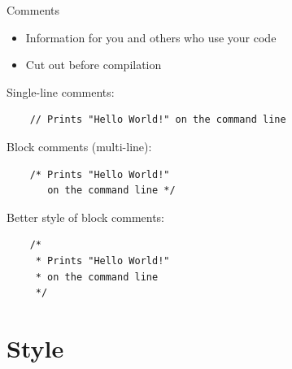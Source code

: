 \begin{frame}[fragile]{Comments}
	\begin{itemize}
		\item Information for you and others who use your code
		\item Cut out before compilation
	\end{itemize}
	Single-line comments:
	\begin{lstlisting}
	// Prints "Hello World!" on the command line
\end{lstlisting}
	Block comments (multi-line):
	\begin{lstlisting}
	/* Prints "Hello World!"
	   on the command line */
\end{lstlisting}
	Better style of block comments:
	\begin{lstlisting}
	/*
	 * Prints "Hello World!"
	 * on the command line
	 */
\end{lstlisting}
\end{frame}
\section{Style}
